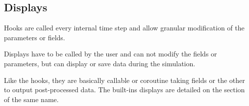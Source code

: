 \documentclass[letterpaper,10pt,english]{sphinxmanual}
\begin{document}
\begin{sphinxVerbatim}[commandchars=\\\{\}]
      
                    

     
           
      

 
  

\end{sphinxVerbatim}

\noindent{}


\subsection{Displays}
\label{\detokenize{overview:displays}}
Hooks are called every internal time step and allow granular modification of the parameters or fields.

Displays have to be called by the user and can not modify the fields or parameters, but can display or save data during the simulation.

Like the hooks, they are basically callable or coroutine taking fields or the other to output post-processed data. The built-ins displays are detailed on the section of the same name.
\end{document}
